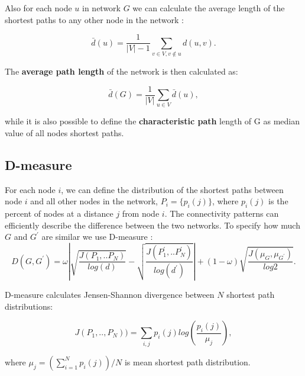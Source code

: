 Also for each node $u$ in network $G$ we can calculate the average length of the shortest paths to any other node in the network \cite{van2010graph}:


\begin{equation}
\bar{d}(u) = \frac{1}{|V|-1} \sum_{v\in V, v \notin u} d(u,v).
\end{equation}

The \textbf{average path length} of the network is then calculated as:


\begin{equation}
\bar{d}(G) = \frac{1}{|V|}\sum_{u \in V} \bar{d}(u),
\end{equation}

while it is also possible to define the \textbf{characteristic path} length of G as median value of all nodes shortest paths. %


\subsection{D-measure}

For each node $i$, we can define the distribution of the shortest paths between node $i$ and all other nodes in the network, $P_{i}=\{p_{i}(j)\}$, where $p_{i}(j)$ is the percent of nodes at a distance $j$ from node $i$. The connectivity patterns can efficiently describe the difference between the two networks.    
To specify how much $G$ and $G^{'}$ are similar we use D-measure \cite{tiago2}:
\begin{equation}
D(G, G^{'}) = \omega \left| \sqrt{\frac{J(P_1,..P_N)}{log(d)}}-\sqrt{\frac{J(P_1^{'},..P_N^{'})}{log(d^{'})}} \right| + (1-\omega) \sqrt{\frac{J(\mu_{G},\mu_{G^{'}})}{log2}}.
\label{eq:dmeasure}
\end{equation}

D-measure calculates Jensen-Shannon divergence between $N$ shortest path distributions:

\begin{equation}
J(P_1,.., P_N)) = \sum_{i,j}p_i(j)log(\frac{p_i(j)}{\mu_j}),
\end{equation}

where  $\mu_j = (\sum_{i=1}^N p_i(j))/N$ is mean shortest path distribution.

